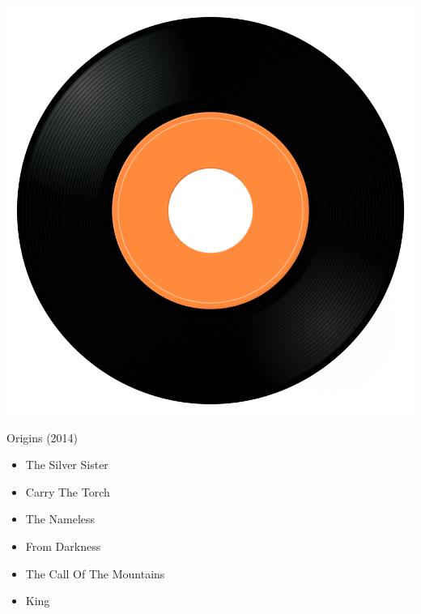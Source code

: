 \begin{minipage}[t]{0.25\textwidth}
\captionsetup{type=figure}
\includegraphics[width=\textwidth]{Images/cover.png}
\caption*{Origins (2014)}
\end{minipage}
\begin{minipage}[t]{0.25\textwidth}\vspace{0pt}
\begin{itemize}[nosep,leftmargin=1em,labelwidth=*,align=left]
	\setlength{\itemsep}{0pt}
	\item The Silver Sister
	\item Carry The Torch
	\item The Nameless
	\item From Darkness
	\item The Call Of The Mountains
	\item King
\end{itemize}
\end{minipage}
